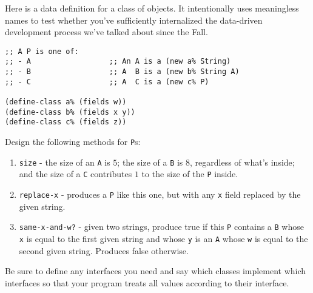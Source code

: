 \documentclass[12pt]{article}                   %
\def\pts#1{\marginpar{\footnotesize \raggedright  \fbox{#1 {\sc Points}}}}
\begin{document}
\vfill\thispagestyle{empty}
\newpage








\begin{problem}\pts{18} %

Here is a data definition for a class of objects.  It intentionally
uses meaningless names to test whether you've sufficiently
internalized the data-driven development process we've talked about
since the Fall.

\begin{verbatim}
;; A P is one of:          
;; - A                  ;; An A is a (new a% String)
;; - B                  ;; A  B is a (new b% String A)
;; - C                  ;; A  C is a (new c% P)

(define-class a% (fields w))
(define-class b% (fields x y))
(define-class c% (fields z))
\end{verbatim}

\noindent
Design the following methods for \verb|P|s:

\begin{enumerate}

\item \verb|size| - the size of an \verb|A| is $5$; the size of a
  \verb|B| is $8$, regardless of what's inside; and the size of a
  \verb|C| contributes $1$ to the size of the \verb|P| inside.

\item \verb|replace-x| - produces a \verb|P| like this one, but
  with any \verb|x| field replaced by the given string.

\item \verb|same-x-and-w?| - given two strings, produce true if this
  \verb|P| contains a \verb|B| whose \verb|x| is equal to the
  first given string and whose \verb|y| is an \verb|A| whose
  \verb|w| is equal to the second given string.  Produces false
  otherwise.

\end{enumerate}

Be sure to define any interfaces you need and say which classes
implement which interfaces so that your program treats all values
according to their interface.


\end{problem}
\end{document}
